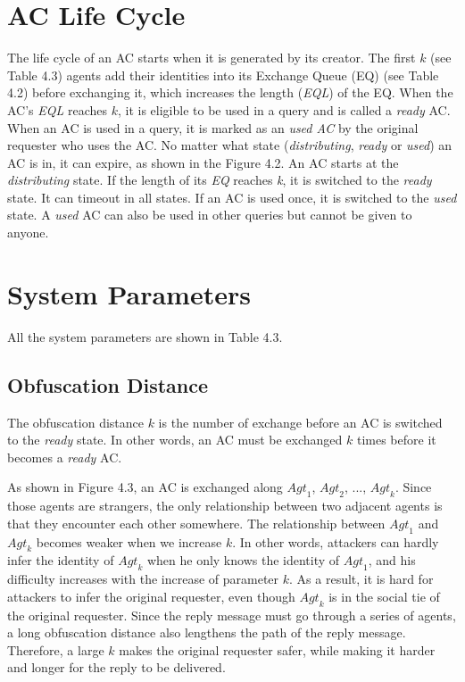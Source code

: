 \section{ AC Life Cycle}

\noindent The life cycle of an AC starts when it is generated by its creator. The first $k$ (see Table 4.3) agents add their identities into its Exchange Queue (EQ) (see Table 4.2) before exchanging it, which increases the length (\textit{EQL}) of the EQ. When the AC's \textit{EQL} reaches $k$, it is eligible to be used in a query and is called a \textit{ready }AC. When an AC is used in a query, it is marked as an \textit{used AC} by the original requester who uses the AC. No matter what state (\textit{distributing}, \textit{ready} or \textit{used}) an AC is in, it can expire, as shown in the Figure 4.2. An AC starts at the \textit{distributing} state. If the length of its \textit{EQ} reaches \textit{k}, it is switched to the \textit{ready} state. It can timeout in all states. If an AC is used once, it is switched to the \textit{used} state. A \textit{used} AC can also be used in other queries but cannot be given to anyone. 

\section{ System Parameters}

\noindent All the system parameters are shown in Table 4.3. 


\subsection{ Obfuscation Distance}

\noindent The obfuscation distance $k$ is the number of exchange before an AC is switched to the \textit{ready} state. In other words, an AC must be exchanged $k$ times before it becomes a \textit{ready} AC.

As shown in Figure 4.3, an AC is exchanged along ${Agt}_1$, ${Agt}_2$, ..., ${Agt}_k$. Since those agents are strangers, the only relationship between two adjacent agents is that they encounter each other somewhere. The relationship between ${Agt}_1$ and ${Agt}_k$ becomes weaker when we increase $k$. In other words, attackers can hardly infer the identity of ${Agt}_k$ when he only knows the identity of ${Agt}_1$, and his difficulty increases with the increase of parameter $k$. As a result, it is hard for attackers to infer the original requester, even though ${Agt}_k$ is in the social tie of the original requester. Since the reply message must go through a series of agents, a long obfuscation distance also lengthens the path of the reply message. Therefore, a large $k$ makes the original requester safer, while making it harder and longer for the reply to be delivered.


